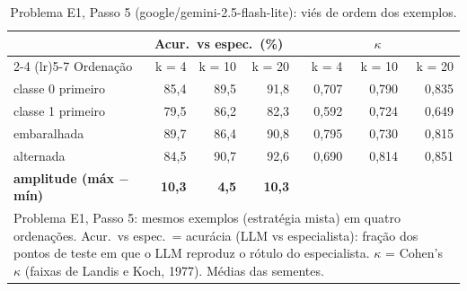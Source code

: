 \begin{table}[htbp]
\centering
\small
\caption{Problema E1, Passo 5 (google/gemini-2.5-flash-lite): viés de ordem dos exemplos.}
\label{tab:bloco2_E1_passo5_ordem_flashlite}
\begin{tabular}{lrrrrrr}
\toprule
 & \multicolumn{3}{c}{Acur.\ vs espec.\ (\%)} & \multicolumn{3}{c}{$\kappa$} \\ \cmidrule(lr){2-4} \cmidrule(lr){5-7}
Ordenação & k = 4 & k = 10 & k = 20 & k = 4 & k = 10 & k = 20 \\
\midrule
classe 0 primeiro & 85,4 & 89,5 & 91,8 & 0,707 & 0,790 & 0,835 \\
classe 1 primeiro & 79,5 & 86,2 & 82,3 & 0,592 & 0,724 & 0,649 \\
embaralhada & 89,7 & 86,4 & 90,8 & 0,795 & 0,730 & 0,815 \\
alternada & 84,5 & 90,7 & 92,6 & 0,690 & 0,814 & 0,851 \\
\midrule
\textbf{amplitude (máx $-$ mín)} & \textbf{10,3} & \textbf{4,5} & \textbf{10,3} &  &  &  \\
\bottomrule
\multicolumn{7}{p{0.95\linewidth}}{\footnotesize Problema E1, Passo 5: mesmos exemplos (estratégia mista) em quatro ordenações. Acur.\ vs espec.\ = acurácia (LLM vs especialista): fração dos pontos de teste em que o LLM reproduz o rótulo do especialista. $\kappa$ = Cohen's $\kappa$ (faixas de Landis e Koch, 1977). Médias das sementes.} \\
\end{tabular}
\end{table}
